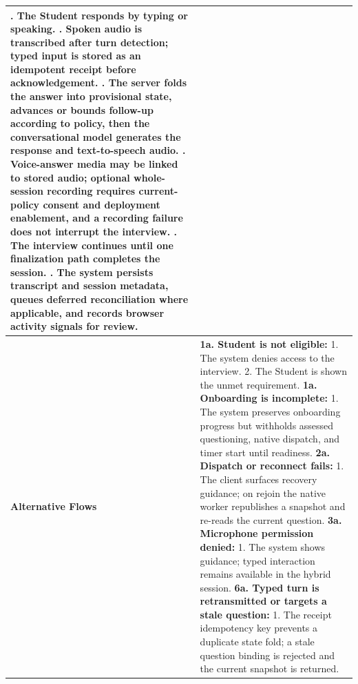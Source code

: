 \begin{longtable}{|>{\raggedright\arraybackslash}p{}|>{\raggedright\arraybackslash}p{}|}
5. The Student responds by typing or speaking. \newline
6. Spoken audio is transcribed after turn detection; typed input is stored as an idempotent receipt before acknowledgement. \newline
7. The server folds the answer into provisional state, advances or bounds follow-up according to policy, then the conversational model generates the response and text-to-speech audio. \newline
8. Voice-answer media may be linked to stored audio; optional whole-session recording requires current-policy consent and deployment enablement, and a recording failure does not interrupt the interview. \newline
9. The interview continues until one finalization path completes the session. \newline
10. The system persists transcript and session metadata, queues deferred reconciliation where applicable, and records browser activity signals for review. \\ \hline
\textbf{Alternative Flows} &
\textbf{1a. Student is not eligible:} \newline
\hspace*{1em}1. The system denies access to the interview. \newline
\hspace*{1em}2. The Student is shown the unmet requirement. \newline
\textbf{1a. Onboarding is incomplete:} \newline
\hspace*{1em}1. The system preserves onboarding progress but withholds assessed questioning, native dispatch, and timer start until readiness. \newline
\textbf{2a. Dispatch or reconnect fails:} \newline
\hspace*{1em}1. The client surfaces recovery guidance; on rejoin the native worker republishes a snapshot and re-reads the current question. \newline
\textbf{3a. Microphone permission denied:} \newline
\hspace*{1em}1. The system shows guidance; typed interaction remains available in the hybrid session. \newline
\textbf{6a. Typed turn is retransmitted or targets a stale question:} \newline
\hspace*{1em}1. The receipt idempotency key prevents a duplicate state fold; a stale question binding is rejected and the current snapshot is returned. \newline

\end{longtable}
